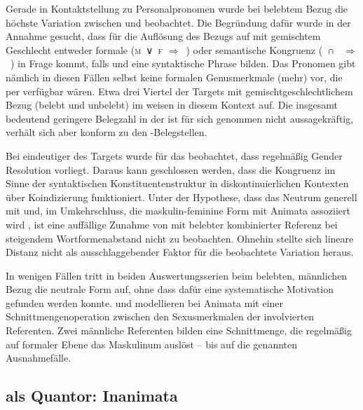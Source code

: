 Gerade in Kontaktstellung zu Personalpronomen wurde bei belebtem Bezug die
höchste Variation zwischen  und  beobachtet. Die
Begründung dafür wurde in der Annahme gesucht, dass für die Auflösung des Bezugs auf  mit gemischtem Geschlecht entweder
formale (\textsc{m}~∨~\textsc{f} $\Rightarrow$~) oder semantische
Kongruenz (\SM{}~∩~\SF{} $\Rightarrow$~) in Frage kommt, falls
 und  eine syntaktische Phrase bilden. Das Pronomen gibt
nämlich in diesen Fällen selbst keine formalen Genus\-merk\-male (mehr) vor,
die per  verfügbar wären. Etwa drei Viertel der Targets mit
gemischtgeschlechtlichem Bezug (belebt und unbelebt)
im \CAO{} weisen in diesem Kontext  auf. Die insgesamt
bedeutend geringere Belegzahl in der \KC{} ist für sich genommen nicht
aussagekräftig, verhält sich aber konform zu den \CAO-Belegstellen.

Bei eindeutiger  des Targets wurde für das \CAO{}
beobachtet, dass regel\-mäßig Gender Re\-solu\-tion vorliegt. Daraus kann
geschlossen werden, dass die Kongruenz im Sinne der syntaktischen
Konstituentenstruktur in diskontinuierlichen Kontexten über Koindizierung
funktioniert. Unter der Hypothese, dass das Neutrum generell mit
 und, im Umkehrschluss, die maskulin-feminine Form mit Animata
assoziiert wird \autocite[243--245]{askedal1973}, ist eine auffällige Zunahme
von  mit belebter kombinierter Referenz bei steigendem
Wortformenabstand nicht zu beobachten. Ohnehin stellte sich
lineare Distanz nicht als ausschlaggebender Faktor für die
beob\-ach\-tete Variation heraus.

In wenigen Fällen tritt in beiden Auswertungs\-serien beim belebten, männlichen
Bezug die neutrale Form auf, ohne dass dafür eine systematische Motivation
gefunden werden konnte. \citet{wechslerzlatic2003} und \citet{wechsler2009}
modellieren  bei Animata mit einer
Schnittmengenoperation zwischen den Sexusmerkmalen der involvierten Referenten.
Zwei männliche Referenten bilden eine Schnittmenge, die regelmäßig auf formaler
Ebene das Maskulinum auslöst -- bis auf die genannten
Ausnahmefälle.


\subsection{ als Quantor: Inanimata}

